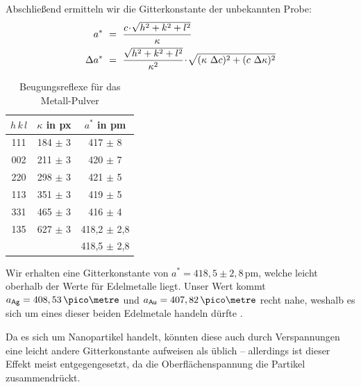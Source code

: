 Abschließend ermitteln wir die Gitterkonstante der unbekannten Probe:
\begin{align}
a^*		~&=~ \frac{c \!\cdot\! \sqrt{h^2 + k^2 + l^2}}{\kappa}	\\
\Delta a^*	~&=~ \frac{\sqrt{h^2 + k^2 + l^2}}{\kappa^2} \!\cdot\! \sqrt{ (\kappa ~ \Delta c)^2 + (c ~ \Delta \kappa)^2}
\label{eq:da}
\end{align}

\begin{table}[p]
\centering
\caption{Beugungsreflexe für das Metall-Pulver}	\label{tab:Edel}
\begin{tabular}{*3c}
	\toprule
	$h\,k\,l$	& $\kappa$ in px	& $a^*$ in pm	\\
	\midrule
	111		& 184 $\pm$ 3		& 417 $\pm$ 8		\\
	002		& 211 $\pm$ 3		& 420 $\pm$ 7		\\
	220		& 298 $\pm$ 3		& 421 $\pm$ 5		\\
	113		& 351 $\pm$ 3		& 419 $\pm$ 5		\\
	331		& 465 $\pm$ 3		& 416 $\pm$ 4		\\
	135		& 627 $\pm$ 3		& 418,2 $\pm$ 2,8		\\
	\midrule
			&				& 418,5 $\pm$ 2,8	\\
	\bottomrule
\end{tabular}
\end{table}

Wir erhalten eine Gitterkonstante von $a^* = 418,5 \pm 2,8$\,pm, welche leicht oberhalb der Werte für Edelmetalle liegt. Unser Wert kommt $a_\mathsf{Ag} = 408,53\,\pico\metre$ und $a_\mathsf{Au} = 407,82\,\pico\metre$ recht nahe, weshalb es sich um eines dieser beiden Edelmetale handeln dürfte \cite{lit:elements}.

Da es sich um Nanopartikel handelt, könnten diese auch durch Verspannungen eine leicht andere Gitterkonstante aufweisen als üblich -- allerdings ist dieser Effekt meist entgegengesetzt, da die Oberflächenspannung die Partikel zusammendrückt.



